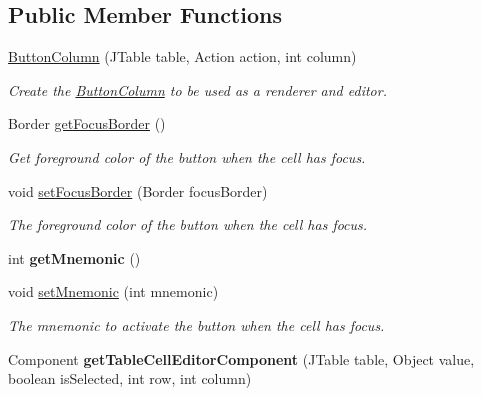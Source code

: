 \subsection*{Public Member Functions}
\begin{DoxyCompactItemize}
\item 
\hyperlink{classedu_1_1udel_1_1cis_1_1vsl_1_1civl_1_1gui_1_1common_1_1ButtonColumn_a2a4865e3faa1ed5e6b37f36b5e7db602}{Button\+Column} (J\+Table table, Action action, int column)
\begin{DoxyCompactList}\small\item\em Create the \hyperlink{classedu_1_1udel_1_1cis_1_1vsl_1_1civl_1_1gui_1_1common_1_1ButtonColumn}{Button\+Column} to be used as a renderer and editor. \end{DoxyCompactList}\item 
Border \hyperlink{classedu_1_1udel_1_1cis_1_1vsl_1_1civl_1_1gui_1_1common_1_1ButtonColumn_a80f97399aeb66eff2908827745a60554}{get\+Focus\+Border} ()
\begin{DoxyCompactList}\small\item\em Get foreground color of the button when the cell has focus. \end{DoxyCompactList}\item 
void \hyperlink{classedu_1_1udel_1_1cis_1_1vsl_1_1civl_1_1gui_1_1common_1_1ButtonColumn_a4df52fad5eb4ea062dc2cb777aa03b8e}{set\+Focus\+Border} (Border focus\+Border)
\begin{DoxyCompactList}\small\item\em The foreground color of the button when the cell has focus. \end{DoxyCompactList}\item 
\hypertarget{classedu_1_1udel_1_1cis_1_1vsl_1_1civl_1_1gui_1_1common_1_1ButtonColumn_a086750dceec69cbb74052dddae5f15bd}{}int {\bfseries get\+Mnemonic} ()\label{classedu_1_1udel_1_1cis_1_1vsl_1_1civl_1_1gui_1_1common_1_1ButtonColumn_a086750dceec69cbb74052dddae5f15bd}

\item 
void \hyperlink{classedu_1_1udel_1_1cis_1_1vsl_1_1civl_1_1gui_1_1common_1_1ButtonColumn_ad7a1f9687bd47f285e96ff8472f3f9b7}{set\+Mnemonic} (int mnemonic)
\begin{DoxyCompactList}\small\item\em The mnemonic to activate the button when the cell has focus. \end{DoxyCompactList}\item 
\hypertarget{classedu_1_1udel_1_1cis_1_1vsl_1_1civl_1_1gui_1_1common_1_1ButtonColumn_a1ee446d9abd954ebf87687f50aea3971}{}Component {\bfseries get\+Table\+Cell\+Editor\+Component} (J\+Table table, Object value, boolean is\+Selected, int row, int column)\label{classedu_1_1udel_1_1cis_1_1vsl_1_1civl_1_1gui_1_1common_1_1ButtonColumn_a1ee446d9abd954ebf87687f50aea3971}


\end{DoxyCompactItemize}
